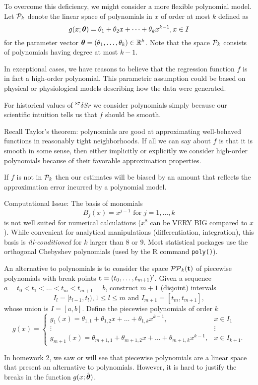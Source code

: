 To overcome this deficiency, we might
consider a more flexible polynomial model. Let ${\cal P}_k$ denote the
linear space of polynomials in $x$ of order at most $k$ defined as
\[
g(x;\mbox{\boldmath $\theta$\unboldmath}) = \theta_1 + \theta_2 x + \dots + \theta_k x^{k-1},
x\in I
\]
for the parameter vector $\mbox{\boldmath $\theta$\unboldmath} = (\theta_1,\dots,\theta_k) \in
{\mathbb R}^k$. Note that the space ${\cal P}_k$ consists of
polynomials having degree at most $k-1$.

In exceptional cases, we have reasons to believe that the regression
function $f$ is in fact a high-order polynomial. This parametric
assumption could be based on physical or physiological models
describing how the data were generated. 


For historical values of $^{87}
\delta Sr$ we consider polynomials simply because our scientific
intuition tells us that $f$ should be
smooth. 

Recall Taylor's theorem: polynomials are good at approximating
well-behaved functions in reasonably tight neighborhoods. If all we can
say about $f$ is that it is smooth in some sense, then either
implicitly or explicitly we consider high-order polynomials because
of their favorable approximation properties. 

If $f$ is not in ${\cal P}_k$ then our
estimates will be biased by an amount that 
reflects the approximation error incurred by a polynomial model.



Computational Issue: The basis of monomials
\[
B_j(x) = x^{j-1} \mbox{ for } j=1,\dots,k
\]
 is not well suited for numerical calculations ($x^8$ can be VERY BIG
 compared to $x$). While convenient for analytical manipulations
 (differentiation, 
integration), this basis is {\it ill-conditioned} for $k$ larger than
$8$ or $9$. Most statistical packages use the orthogonal Chebyshev
polynomials (used by the R command {\tt poly()}).


An alternative to polynomials is to consider the space ${\cal
  PP}_k({\mathbf t})$ of piecewise polynomials with break points
  ${\mathbf t}=(t_0,\dots,t_{m+1})'$. 
Given a sequence $a = t_0 < t_1 < \dots < t_m < t_{m+1} = b$,
  construct $m+1$ (disjoint) intervals
\[
I_l = [t_{l-1},t_l), 1 \leq l \leq m \mbox{ and } I_{m+1} =
[t_m,t_{m+1}],
\]
whose union is $I=[a,b]$. Define the piecewise polynomials of order
$k$  
\[
g(x) = \left\{   \begin{array}{cc}
    g_1(x) = \theta_{1,1} + \theta_{1,2} x + \dots + \theta_{1,k}
    x^{k-1},&x \in I_1\\
    \vdots&\vdots\\
    g_{m+1}(x) = \theta_{m+1,1} + \theta_{m+1,2} x + \dots + \theta_{m+1,k}
    x^{k-1},&x \in I_{k+1}.
\end{array}
\right.
\]

In homework 2, we saw or will see that piecewise polynomials are a
linear space that present an
alternative to polynomials. However, it is hard to justify the breaks
in the function $g(x;\hat{\mbox{\boldmath $\theta$\unboldmath}})$. 


